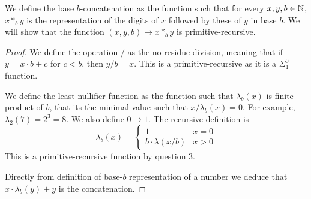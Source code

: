 \question{}
We define the base $b$-concatenation as the function such that for every $x, y, b \in \mathbb{N}$, $x *_b y$ is the representation of the digits of $x$ followed by these of $y$ in base $b$.
We will show that the function $(x, y, b) \mapsto x *_b y$ is primitive-recursive.
\begin{proof}
	We define the operation $/$ as the no-residue division, meaning that if $y = x \cdot b + c$ for $c < b$, then $y / b = x$.
	This is a primitive-recursive as it is a $\Sigma_1^0$ function.

	We define the least nullifier function as the function such that $\lambda_b(x)$ is finite product of $b$, that its the minimal value such that $x / \lambda_b(x) = 0$.
	For example, $\lambda_2(7) = 2^3 = 8$.
	We also define $0 \mapsto 1$.
	The recursive definition is 
	\[
		\lambda_b(x)
		= \begin{cases}
			1 & x = 0 \\
			b \cdot \lambda(x / b) & x > 0
		\end{cases}
	\]
	This is a primitive-recursive function by question 3.

	Directly from definition of base-$b$ representation of a number we deduce that $x \cdot \lambda_b(y) + y$ is the concatenation.
\end{proof}



